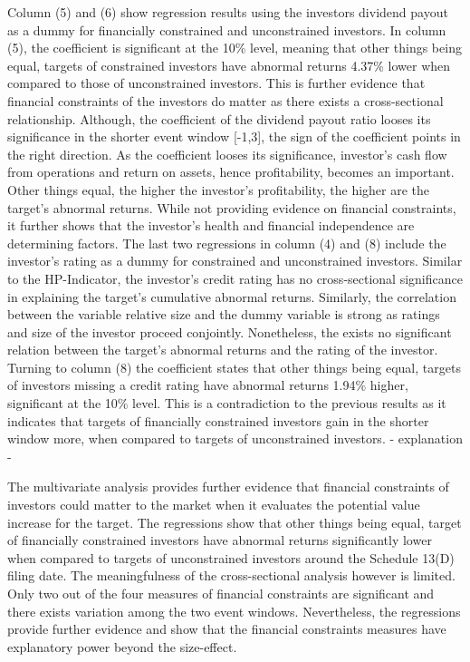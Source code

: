 \documentclass[12pt]{article}
\begin{document}
Column (5) and (6) show regression results using the investors dividend payout as a dummy for financially constrained and unconstrained investors. In column (5), the coefficient is significant at the 10\% level, meaning that other things being equal, targets of constrained investors have abnormal returns 4.37\% lower when compared to those of unconstrained investors. This is further evidence that financial constraints of the investors do matter as there exists a cross-sectional relationship. Although, the coefficient of the dividend payout ratio looses its significance in the shorter event window [-1,3], the sign of the coefficient points in the right direction. As the coefficient looses its significance, investor's cash flow from operations and return on assets, hence profitability, becomes an important. Other things equal, the higher the investor's profitability, the higher are the target's abnormal returns. While not providing evidence on financial constraints, it further shows that the investor's health and financial independence are determining factors. 
The last two regressions in column (4) and (8) include the investor's rating as a dummy for constrained and unconstrained investors. Similar to the HP-Indicator, the investor's credit rating has no cross-sectional significance in explaining the target's cumulative abnormal returns. Similarly, the correlation between the variable relative size and the dummy variable is strong as ratings and size of the investor proceed conjointly. Nonetheless, the exists no significant relation between the target's abnormal returns and the rating of the investor. Turning to column (8) the coefficient states that other things being equal, targets of investors missing a credit rating have abnormal returns 1.94\% higher, significant at the 10\% level. This is a contradiction to the previous results as it indicates that targets of financially constrained investors gain in the shorter window more, when compared to targets of unconstrained investors. - explanation - 

The multivariate analysis provides further evidence that financial constraints of investors could matter to the market when it evaluates the potential value increase for the target. The regressions show that other things being equal, target of financially constrained investors have abnormal returns significantly lower when compared to targets of unconstrained investors around the Schedule 13(D) filing date.  The meaningfulness of the cross-sectional analysis however is limited. Only two out of the four measures of financial constraints are significant and there exists variation among the two event windows. Nevertheless, the regressions provide further evidence and show that the financial constraints measures have explanatory power beyond the size-effect.
\end{document}
